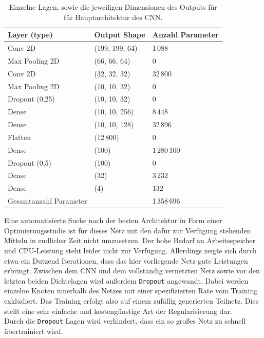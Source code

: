 \begin{table}[htb]
  \centering%
  \begin{tabular}{l
                  l
                  l}
      \toprule
      Layer (type)    & Output Shape     & Anzahl Parameter      \\
      \midrule
      Conv 2D         & (199, 199, 64)  & 1\,088 \\
      Max Pooling 2D  & (66, 66, 64)    & 0 \\
      Conv 2D         & (32, 32, 32)    & 32\,800 \\
      Max Pooling 2D  & (10, 10, 32)    & 0 \\
      Dropout (0,25)  & (10, 10, 32)    & 0 \\
      Dense           & (10, 10, 256)   & 8\,448 \\
      Dense           & (10, 10, 128)   & 32\,896 \\
      Flatten         & (12\,800)         & 0 \\
      Dense           & (100)           & 1\,280\,100 \\
      Dropout (0,5)   & (100)           & 0 \\
      Dense           & (32)            & 3\,232 \\
      Dense           & (4)             & 132 \\
      \midrule
      Gesamtanzahl Parameter &                & 1\,358\,696 \\
      \bottomrule
  \end{tabular}
  \caption{Einzelne Lagen, sowie die jeweiligen Dimensionen des Outputs für für Hauptarchitektur des CNN.}
  \label{tab:haupt}
\end{table}
%
Eine automatisierte Suche nach der besten Architektur in Form einer
Optimierungsstudie ist für dieses Netz mit den dafür zur Verfügung stehenden
Mitteln in endlicher Zeit nicht umzusetzen. Der hohe Bedarf an Arbeitsspeicher
und CPU-Leistung steht leider nicht zur Verfügung. Allerdings zeigte sich durch
etwa ein Dutzend Iterationen, dass das hier vorliegende Netz gute Leistungen
erbringt. Zwischen dem CNN und dem vollständig vernetzten Netz sowie vor
den letzten beiden Dichtelagen wird außerdem \texttt{Dropout} angewandt.
Dabei werden einzelne Knoten innerhalb des Netzes mit einer spezifizierten Rate
vom Training exkludiert. Das Training erfolgt also auf einem zufällig
generierten Teilnetz. Dies stellt eine sehr einfache und kostengünstige Art
der Regularisierung dar.\\
Durch die \texttt{Dropout} Lagen wird verhindert, dass ein so großes Netz zu schnell übertrainiert wird. \\
